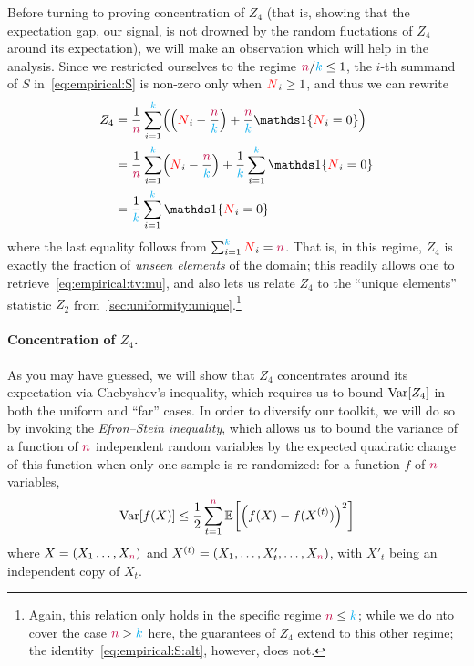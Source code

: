 Before turning to proving concentration of $Z_4$ (that is, showing that the expectation gap, our signal, is not drowned by the random fluctations of $Z_4$ around its expectation), we will make an observation which will help in the analysis. Since we restricted ourselves to the regime ${\textcolor{purple}{n}}/{\textcolor{cyan}{k}}\leq 1$, the $i$-th summand of $S$ in~\cref{eq:empirical:S} is non-zero only when $\textcolor{red}{N}_i\geq 1$, and thus we can rewrite
\begin{align}
  Z_4
  &= \frac{1}{\ns} \sum_{i=1}^\ab \Paren{ \Paren{ \occur_i - \frac{\ns}{\ab} } +  \frac{\ns}{\ab} \indic{\occur_i = 0} } \notag\\
  &= \frac{1}{\ns} \sum_{i=1}^\ab \Paren{ \occur_i - \frac{\ns}{\ab} } + \frac{1}{\ab} \sum_{i=1}^\ab \indic{\occur_i = 0} \notag\\
  &= \frac{1}{\ab} \sum_{i=1}^\ab \indic{\occur_i = 0} \label{eq:empirical:S:alt}
\end{align}
where the last equality follows from $\sum_{i=1}^{\textcolor{cyan}{k}} \textcolor{red}{N}_i = {\textcolor{purple}{n}}$. 
That is, in this regime, $Z_4$ is exactly the fraction of \emph{unseen elements} of the domain; this readily allows one to retrieve~\cref{eq:empirical:tv:mu}, and also lets us relate $Z_4$ to the ``unique elements'' statistic $Z_2$ from~\cref{sec:uniformity:unique}.\footnote{Again, this relation only holds in the specific regime ${\textcolor{purple}{n}} \leq {\textcolor{cyan}{k}}$; while we do nto cover the case ${\textcolor{purple}{n}} > {\textcolor{cyan}{k}}$ here, the guarantees of $Z_4$ extend to this other regime; the identity~\cref{eq:empirical:S:alt}, however, does not.}

\paragraph{Concentration of $Z_4$.} As you may have guessed, we will show that $Z_4$ concentrates around its expectation via Chebyshev's inequality, which requires us to bound $\operatorname{Var}[Z_4]$ in both the uniform and ``far'' cases. In order to diversify our toolkit, we will do so by invoking the \emph{Efron--Stein inequality}, which allows us to bound the variance of a function of ${\textcolor{purple}{n}}$ independent random variables by the expected quadratic change of this function when only one sample is re-randomized: for a function $f$ of ${\textcolor{purple}{n}}$ variables,
\begin{align}
    \Var[ f(X)]  \leq \frac{1}{2} \sum_{t=1}^\ns \bEE{ \Paren{ f(X) - f(X^{(t)}) }^2 }
\end{align}
where $X=(X_1\dots,X_{\textcolor{purple}{n}})$ and $X^{(t)} = (X_1,\dots, X'_t, \dots, X_{\textcolor{purple}{n}})$, with $X'_t$ being an independent copy of $X_t$.

